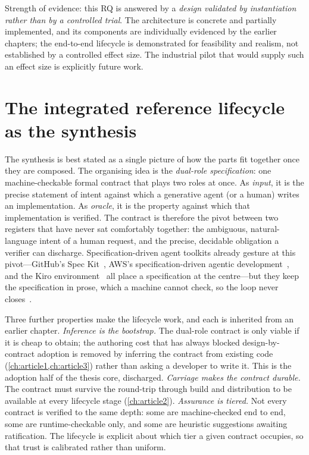 Strength of evidence: this RQ is answered by a \emph{design validated by
instantiation rather than by a controlled trial}. The architecture is concrete and
partially implemented, and its components are individually evidenced by the earlier
chapters; the end-to-end lifecycle is demonstrated for feasibility and realism, not
established by a controlled effect size. The industrial pilot that would supply
such an effect size is explicitly future work.

\section{The integrated reference lifecycle as the synthesis}

The synthesis is best stated as a single picture of how the parts fit together
once they are composed. The organising idea is the \emph{dual-role
specification}: one machine-checkable formal contract that plays two roles at once.
As \emph{input}, it is the precise statement of intent against which a generative
agent (or a human) writes an implementation. As \emph{oracle}, it is the property
against which that implementation is verified. The contract is therefore the pivot
between two registers that have never sat comfortably together: the ambiguous,
natural-language intent of a human request, and the precise, decidable obligation a
verifier can discharge. Specification-driven agent toolkits already gesture at this
pivot---GitHub's Spec Kit~\citep{githubspeckit}, AWS's specification-driven
agentic development~\citep{awsaidlc}, and the Kiro environment~\citep{awskiro} all place a
specification at the centre---but they keep the specification in prose, which a
machine cannot check, so the loop never closes~\citep{ozkaya2023llmse}.

Three further properties make the lifecycle work, and each is inherited from an
earlier chapter. \emph{Inference is the bootstrap.} The dual-role contract is only
viable if it is cheap to obtain; the authoring cost that has always blocked
design-by-contract adoption is removed by inferring the contract from existing code
(\cref{ch:article1,ch:article3}) rather than asking a developer to write it. This
is the adoption half of the thesis core, discharged. \emph{Carriage makes the
contract durable.} The contract must survive the round-trip through build and
distribution to be available at every lifecycle stage (\cref{ch:article2}).
\emph{Assurance is tiered.} Not every contract is verified to the same depth: some
are machine-checked end to end, some are runtime-checkable only, and some are
heuristic suggestions awaiting ratification. The lifecycle is explicit about which
tier a given contract occupies, so that trust is calibrated rather than uniform.

